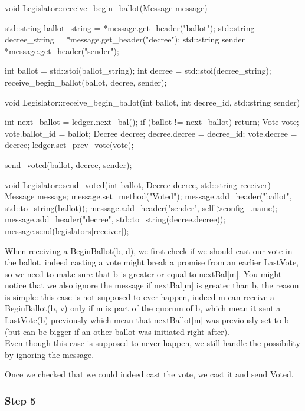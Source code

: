 \documentclass{article}
\begin{document}
\begin{code}
void Legislator::receive_begin_ballot(Message message)
{
    std::string ballot_string = *message.get_header("ballot");
    std::string decree_string = *message.get_header("decree");
    std::string sender = *message.get_header("sender");

    int ballot = std::stoi(ballot_string);
    int decree = std::stoi(decree_string);
    receive_begin_ballot(ballot, decree, sender);
}

void Legislator::receive_begin_ballot(int ballot, int decree_id,
        std::string sender)
{
    int next_ballot = ledger.next_bal();
    if (ballot != next_ballot)
        return;
    Vote vote;
    vote.ballot_id = ballot;
    Decree decree;
    decree.decree = decree_id;
    vote.decree = decree;
    ledger.set_prev_vote(vote);

    send_voted(ballot, decree, sender);
}

void Legislator::send_voted(int ballot, Decree decree, std::string receiver)
{
    Message message;
    message.set_method("Voted");
    message.add_header("ballot", std::to_string(ballot));
    message.add_header("sender", self->config_.name);
    message.add_header("decree", std::to_string(decree.decree));
    message.send(legislators[receiver]);
}
\end{code}
When receiving a BeginBallot(b, d), we first check if we should cast our vote in the ballot, indeed casting a vote might break a promise from an earlier LastVote, so we need to make sure that b is greater or equal to nextBal[m]. You might notice that we also ignore the message if nextBal[m] is greater than b, the reason is simple: this case is not supposed to ever happen, indeed m can receive a BeginBallot(b, v) only if m is part of the quorum of b, which mean it sent a LastVote(b) previously which mean that nextBallot[m] was previously set to b (but can be bigger if an other ballot was initiated right after).\\
Even though this case is supposed to never happen, we still handle the possibility by ignoring the message.

Once we checked that we could indeed cast the vote, we cast it and send Voted.

\subsubsection{Step 5}
\end{document}
